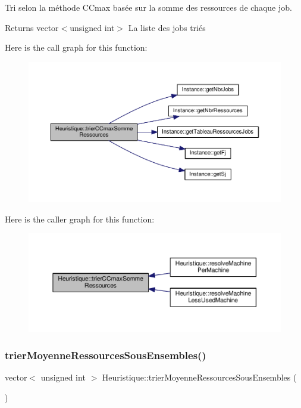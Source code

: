 Tri selon la méthode C\+Cmax basée sur la somme des ressources de chaque job. 

\begin{DoxyReturn}{Returns}
vector$<$unsigned int$>$ La liste des jobs triés 
\end{DoxyReturn}
Here is the call graph for this function\+:\nopagebreak
\begin{figure}[H]
\begin{center}
\leavevmode
\includegraphics[width=350pt]{classHeuristique_a38c390423fc2b190da599148ca879cd6_cgraph}
\end{center}
\end{figure}
Here is the caller graph for this function\+:\nopagebreak
\begin{figure}[H]
\begin{center}
\leavevmode
\includegraphics[width=350pt]{classHeuristique_a38c390423fc2b190da599148ca879cd6_icgraph}
\end{center}
\end{figure}
\mbox{\label{classHeuristique_a4541884c49c13e08ee6c73c919388fd3}} 
\subsubsection{\texorpdfstring{trier\+Moyenne\+Ressources\+Sous\+Ensembles()}{trierMoyenneRessourcesSousEnsembles()}}
{\footnotesize\ttfamily vector$<$ unsigned int $>$ Heuristique\+::trier\+Moyenne\+Ressources\+Sous\+Ensembles (\begin{DoxyParamCaption}{ }\end{DoxyParamCaption})}



